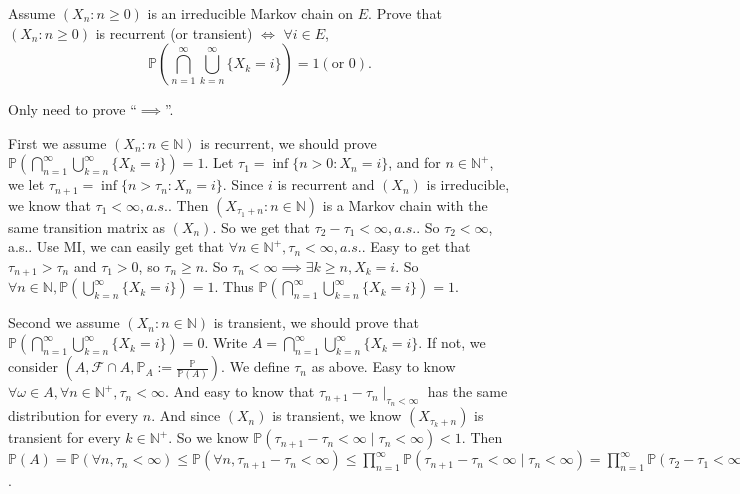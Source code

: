 \documentclass{ctexart}
\newif\ifpreface
\begin{document}
\large
\setlength{\baselineskip}{1.2em}
\ifpreface
  
\else
\fi
{}
\begin{problem}\label{pro:1}
  Assume \((X_n:n \geq 0)\) is an irreducible Markov chain on \(E\).
  Prove that \((X_n:n \geq 0)\) is recurrent (or transient) \(\iff\)
  \(\forall i \in E\),
  \[
    \mathbb{P}\left(\bigcap_{n=1}^{\infty} \bigcup_{k=n}^{\infty} \{X_k=i\}\right)=1 (\text{or } 0).
  \]
\end{problem}
\begin{solution}
  Only need to prove ``\(\implies\)''.

  First we assume \((X_n:n \in \mathbb{N})\) is recurrent, we should prove \(\mathbb{P}\left(\bigcap_{n=1}^{\infty} \bigcup_{k=n}^{\infty} \{X_k=i\}\right)=1\).
  Let \(\tau_1=\inf \{n > 0:X_n=i\}\), and for \(n \in \mathbb{N}^+\), we let \(\tau_{n+1}=\inf \{n > \tau_n:X_n=i\}\).
  Since \(i\) is recurrent and \((X_n)\) is irreducible, we know that \(\tau_1<\infty,a.s.\).
  Then \((X_{\tau_1+n}:n \in \mathbb{N})\) is a Markov chain with the same transition matrix as \((X_n)\).
  So we get that \(\tau_2-\tau_1 < \infty,a. s.\). So \(\tau_2<\infty\), a.s..
  Use MI, we can easily get that \(\forall n \in \mathbb{N}^+,\tau_n<\infty,a. s.\).
  Easy to get that \(\tau_{n+1}>\tau_n\) and \(\tau_1>0\), so \(\tau_n \geq n\).
  So \(\tau_n<\infty \implies \exists k \geq n,X_k=i\).
  So \(\forall n \in \mathbb{N},\mathbb{P}\left(  \bigcup_{k=n}^{\infty} \{X_k=i\}\right)=1\).
  Thus \(\mathbb{P}\left(\bigcap_{n=1}^{\infty} \bigcup_{k=n}^{\infty} \{X_k=i\}\right)=1\).

  Second we assume \((X_n:n \in \mathbb{N})\) is transient, we should prove that \(\mathbb{P}\left(\bigcap_{n=1}^{\infty} \bigcup_{k=n}^{\infty} \{X_k=i\}\right)=0\).
  Write \(A=\bigcap_{n=1}^{\infty} \bigcup_{k=n}^{\infty} \{X_k=i\}\).
  If not, we consider \((A,\mathcal{F} \cap A,\mathbb{P}_A:=\frac{\mathbb{P}}{\mathbb{P}(A)})\).
  We define \(\tau_n \) as above. Easy to know \(\forall \omega \in A,\forall n \in \mathbb{N}^+,\tau_n<\infty\).
  And easy to know that \(\tau_{n+1}-\tau_n \mid_{\tau_n<\infty}\) has the same distribution for every \(n\).
  And since \((X_n)\) is transient, we know \((X_{\tau_k+n})\) is transient for every \(k \in \mathbb{N}^+\).
  So we know \(\mathbb{P}(\tau_{n+1}-\tau_n<\infty \mid \tau_n<\infty)<1\).
  Then \(\mathbb{P}(A)=\mathbb{P}(\forall n,\tau_n < \infty) \leq \mathbb{P}(\forall n,\tau_{n+1}-\tau_n<\infty) \leq \prod_{n=1}^{\infty} \mathbb{P}(\tau_{n+1}-\tau_n<\infty \mid \tau_n<\infty)=\prod_{n=1}^{\infty} \mathbb{P}(\tau_2-\tau_1<\infty \mid \tau_1<\infty)=0\).
\end{solution}
\end{document}
